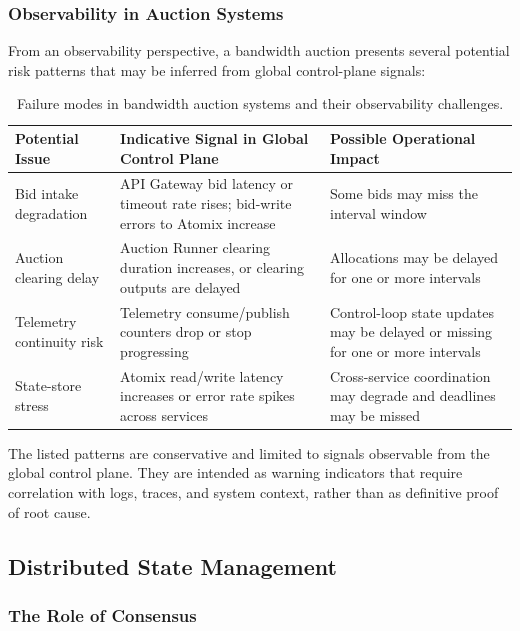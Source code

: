 \subsubsection{Observability in Auction Systems}

From an observability perspective, a bandwidth auction presents several potential risk patterns that may be inferred from global control-plane signals:

\begin{table}[h]
\centering
\small
\begin{tabularx}{\linewidth}{|l|X|X|}
\hline
\textbf{Potential Issue} & \textbf{Indicative Signal in Global Control Plane} & \textbf{Possible Operational Impact} \\
\hline
Bid intake degradation & API Gateway bid latency or timeout rate rises; bid-write errors to Atomix increase & Some bids may miss the interval window \\
\hline
Auction clearing delay & Auction Runner clearing duration increases, or clearing outputs are delayed & Allocations may be delayed for one or more intervals \\
\hline
Telemetry continuity risk & Telemetry consume/publish counters drop or stop progressing & Control-loop state updates may be delayed or missing for one or more intervals \\
\hline
State-store stress & Atomix read/write latency increases or error rate spikes across services & Cross-service coordination may degrade and deadlines may be missed \\
\hline
\end{tabularx}
\caption{Failure modes in bandwidth auction systems and their observability challenges.}
\label{table:auction_failures}
\end{table}

The listed patterns are conservative and limited to signals observable from the global control plane. They are intended as warning indicators that require correlation with logs, traces, and system context, rather than as definitive proof of root cause.

\subsection{Distributed State Management}

\subsubsection{The Role of Consensus}

